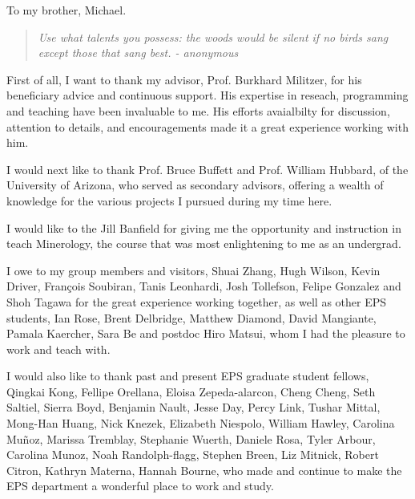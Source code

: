\documentclass[phd,12pt]{ucbthesis}
\begin{document}
\begin{frontmatter}

\begin{dedication}
\null\vfil
\begin{center}
To my brother, Michael.\\\vspace{12pt}

\begin{quote}
    {\small\textit{Use what talents you possess: the woods would be silent if no
birds sang except those that sang best. - anonymous
}}
\end{quote}
\end{center}
\vfil\null
\end{dedication}


\tableofcontents
\clearpage
\listoffigures
\clearpage
\listoftables

\begin{acknowledgements}
First of all, I want to thank my advisor, Prof. Burkhard Militzer, for his
beneficiary advice and continuous support. His expertise in reseach, programming and
teaching have been invaluable to me. His efforts avaialbilty for discussion, attention to
details, and encouragements made it a great experience working with him.

I would next like to thank Prof. Bruce Buffett and Prof. William Hubbard, of the
University of Arizona, who served as secondary advisors, offering a wealth of
knowledge for the various projects I pursued during my time here. 

I would like to the Jill Banfield for giving me the opportunity and instruction in
teach Minerology, the course that was most enlightening to me as an undergrad.

I owe to my group members and visitors, Shuai Zhang, Hugh Wilson, Kevin Driver,
Fran\c{c}ois Soubiran, Tanis Leonhardi, Josh Tollefson, Felipe Gonzalez and Shoh
Tagawa for the great experience working together, as well as other EPS students, Ian
Rose, Brent Delbridge, Matthew Diamond, David Mangiante, Pamala Kaercher, Sara Be and
postdoc Hiro Matsui, whom I had the pleasure to work and teach with.

I would also like to thank past and present EPS graduate student fellows, Qingkai
Kong, Fellipe Orellana, Eloisa Zepeda-alarcon, Cheng Cheng, Seth Saltiel, Sierra
Boyd, Benjamin Nault, Jesse Day, Percy Link, Tushar Mittal, Mong-Han Huang, Nick
Knezek, Elizabeth Niespolo, William Hawley, Carolina Mu\~noz,  Marissa Tremblay,
Stephanie Wuerth, Daniele Rosa, Tyler Arbour, Carolina Munoz,  Noah Randolph-flagg,
Stephen Breen, Liz Mitnick, Robert Citron, Kathryn Materna,  Hannah Bourne, who made
and continue to make the EPS department a wonderful place to work and study.


\end{acknowledgements}
\end{frontmatter}
\end{document}
